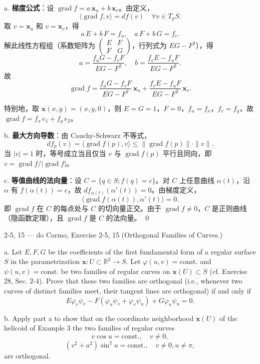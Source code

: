\begin{solution}
a. \textbf{梯度公式}：设 $\operatorname{grad} f = a\, \mathbf{x}_u + b\, \mathbf{x}_v$。由定义，
\[
\langle \operatorname{grad} f, v\rangle = df(v)\quad \forall v \in T_pS.
\]
取 $v = \mathbf{x}_u$ 和 $v = \mathbf{x}_v$，得
\[
a\, E + b\, F = f_u,\quad a\, F + b\, G = f_v.
\]
解此线性方程组（系数矩阵为 $\begin{pmatrix}E & F\\ F & G\end{pmatrix}$，行列式为 $EG - F^2$），得
\[
a = \frac{f_u G - f_v F}{EG - F^2},\quad b = \frac{f_v E - f_u F}{EG - F^2}.
\]
故
\[
\operatorname{grad} f = \frac{f_u G - f_v F}{EG - F^2}\,\mathbf{x}_u + \frac{f_v E - f_u F}{EG - F^2}\,\mathbf{x}_v.
\]

特别地，取 $\mathbf{x}(x,y) = (x,y,0)$，则 $E = G = 1$，$F = 0$，$f_u = f_x$，$f_v = f_y$，故 $\operatorname{grad} f = f_x\, e_1 + f_y\, e_2$。

b. \textbf{最大方向导数}：由 Cauchy-Schwarz 不等式，
\[
df_p(v) = \langle \operatorname{grad} f(p), v\rangle \leq \|\operatorname{grad} f(p)\| \cdot \|v\|.
\]
当 $|v| = 1$ 时，等号成立当且仅当 $v$ 与 $\operatorname{grad} f(p)$ 平行且同向，即 $v = \operatorname{grad} f / |\operatorname{grad} f|$。

c. \textbf{等值曲线的法向量}：设 $C = \{q \in S; f(q) = c\}$。对 $C$ 上任意曲线 $\alpha(t)$，沿 $\alpha$ 有 $f(\alpha(t)) = c$，故 $df_{\alpha(t)}(\alpha'(t)) = 0$。由梯度定义，
\[
\langle \operatorname{grad} f(\alpha(t)), \alpha'(t)\rangle = 0.
\]
即 $\operatorname{grad} f$ 在 $C$ 的每点处与 $C$ 的切向量正交。由于 $\operatorname{grad} f \neq 0$，$C$ 是正则曲线（隐函数定理），且 $\operatorname{grad} f$ 是 $C$ 的法向量。
\qed
\end{solution}

\begin{exercise}{2-5, 15 — do Carmo, Exercise 2-5, 15}
(Orthogonal Families of Curves.)

a. Let $E, F, G$ be the coefficients of the first fundamental form of a regular surface $S$ in the parametrization $\mathbf{x}: U \subset \mathbb{R}^2 \to S$. Let $\varphi(u, v) = \mathrm{const.}$ and $\psi(u, v) = \mathrm{const.}$ be two families of regular curves on $\mathbf{x}(U) \subset S$ (cf. Exercise 28, Sec. 2-4). Prove that these two families are orthogonal (i.e., whenever two curves of distinct families meet, their tangent lines are orthogonal) if and only if
\[
E \varphi_v \psi_v - F(\varphi_u \psi_v + \varphi_v \psi_u) + G \varphi_u \psi_u = 0.
\]

b. Apply part a to show that on the coordinate neighborhood $\mathbf{x}(U)$ of the helicoid of Example 3 the two families of regular curves
\[
v \cos u = \mathrm{const.}, \quad v \neq 0,
\]
\[
(v^2 + a^2) \sin^2 u = \mathrm{const.}, \quad v \neq 0, u \neq \pi,
\]
are orthogonal.
\end{exercise}

